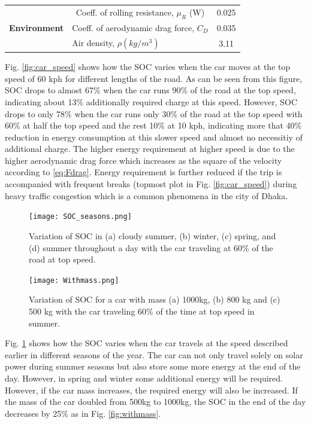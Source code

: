 \documentclass[journal]{IEEEtran/IEEEtran}
\newcommand{\figref}[1]{Fig. \ref{#1}}
\begin{document}
\begin{table}[!t]
\begin{tabular}{|p{2.35cm}|c|c|}
			\multirow{3}{*}{\textbf{Environment\cite{leitman}}}
			& \multicolumn{1}{L{.5\columnwidth}|}{Coeff. of rolling resistance, $\mu_{R}$ (W)} & \multicolumn{1}{c|}{0.025} \\\cline{2-3}
			& \multicolumn{1}{l|}{Coeff. of aerodynamic drag force, $C_D$} & \multicolumn{1}{c|}{0.035} \\\cline{2-3}
			& \multicolumn{1}{l|}{Air density, $\rho (kg/m^3)$} & \multicolumn{1}{c|}{3.11} \\\hline
		\end{tabular}
	\end{table}
	
	\figref{fig:car_speed} shows how the SOC varies when the car moves at the top speed of 60 kph for different lengths of the road. As can be seen from this figure, SOC drops to almost 67\% when the car runs 90\% of the road at the top speed, indicating about 13\% additionally required charge at this speed. However, SOC drops to only 78\% when the car runs only 30\% of the road at the top speed with 60\% at half the top speed and the rest 10\% at 10 kph, indicating more that 40\% reduction in energy consumption at this slower speed and almost no necessitiy of additional charge. The higher energy requirement at higher speed is due to the higher aerodynamic drag force which increases as the square of the velocity according to \eqref{eq:Fdrag}. Energy requirement is further reduced if the trip is accompanied with frequent breaks (topmost plot in \figref{fig:car_speed}) during heavy traffic congestion which is a common phenomena in the city of Dhaka.
	
	\begin{figure}[!tb]
		\centering
		\texttt{[image: SOC\_seasons.png]}
		\caption{Variation of SOC in (a) cloudy summer, (b) winter, (c) spring, and (d) summer throughout a day with the car traveling at 60\% of the road at top speed.}
		\label{fig:SOCseasons}
	\end{figure}
	\begin{figure}[!tb]
		\centering
		\texttt{[image: Withmass.png]}
		\caption{Variation of SOC for a car with mass (a) 1000kg, (b) 800 kg and (c) 500 kg with the car traveling 60\% of the time at top speed in summer.}
		\label{fig:mass}
	\end{figure}
	
	\figref{fig:SOCseasons} shows how the SOC varies when the car travels at the speed described earlier in different seasons of the year. The car can not only travel solely on solar power during summer seasons but also store some more energy at the end of the day. However, in spring and winter some additional energy will be required. However, if the car mass increases, the required energy will also be increased. If the mass of the car doubled from 500kg to 1000kg, the SOC in the end of the day decreases by 25\% as in \figref{fig:withmass}.
	
\end{document}
